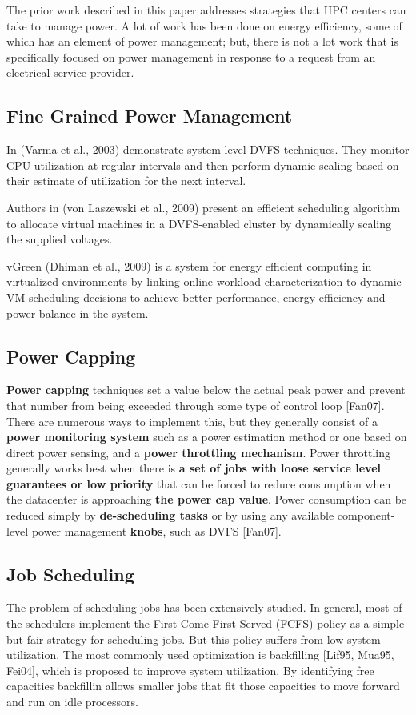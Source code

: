 The prior work described in this paper addresses strategies
that HPC centers can take to manage power. A lot of work has been done on
energy efficiency, some of which has an element of power management; but,
there is not a lot work that is specifically focused on power management in
response to a request from an electrical service provider.

\subsection{Fine Grained Power Management}
In \cite{varma_control-theoretic_2003} (Varma et al., 2003) demonstrate system-level DVFS techniques. They
monitor CPU utilization at regular intervals and then perform dynamic
scaling based on their estimate of utilization for the next interval.

Authors in\cite{von_laszewski_power-aware_2009} (von Laszewski et al., 2009) present an efficient scheduling
algorithm to allocate virtual machines in a DVFS-enabled cluster by
dynamically scaling the supplied voltages.

vGreen \cite{dhiman_vgreen:_2009} (Dhiman et al., 2009) is a system for energy efficient computing in
virtualized environments by linking online workload characterization to
dynamic VM scheduling decisions to achieve better performance, energy
efficiency and power balance in the system.

\subsection{Power Capping}

\textbf{Power capping }techniques set a value below the actual peak power
and prevent that number from being exceeded through some type of control
loop [Fan07]. There are numerous ways to implement this, but they generally
consist of a \textbf{power monitoring system }such as a power estimation
method or one based on direct power sensing, and a \textbf{power throttling
mechanism}. Power throttling generally works best when there is \textbf{a
set of jobs with loose service level guarantees or low priority }that can be
forced to reduce consumption when the datacenter is approaching \textbf{the
power cap value}. Power consumption can be reduced simply by
\textbf{de-scheduling tasks }or by using any available component-level power
management \textbf{knobs}, such as DVFS [Fan07].

\subsection{Job Scheduling}
The problem of scheduling jobs has been extensively studied. In general,
most of the schedulers implement the First Come First Served (FCFS) policy
as a simple but fair strategy for scheduling jobs. But this policy suffers
from low system utilization. The most commonly used optimization is backfilling
\cite{lifka_anl/ibm_1995} 
\cite{mualem_utilization_2001}
\cite{feitelson_parallel_2004}
[Lif95, Mua95, Fei04], which is proposed to improve system
utilization. By identifying free capacities backfillin allows smaller
jobs that fit those capacities to move forward and run on idle processors.

